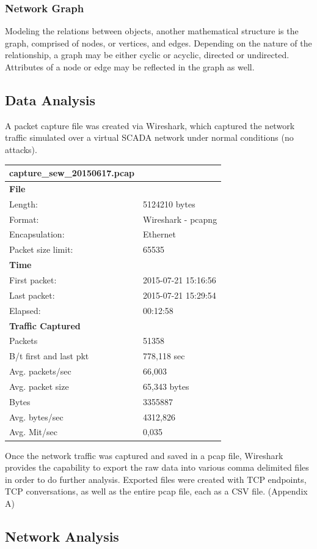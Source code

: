 \documentclass[11pt,]{article}
\begin{document}
\subsubsection{Network Graph}\label{network-graph}

Modeling the relations between objects, another mathematical structure
is the graph, comprised of nodes, or vertices, and edges. Depending on
the nature of the relationship, a graph may be either cyclic or acyclic,
directed or undirected. Attributes of a node or edge may be reflected in
the graph as well.

\subsection{Data Analysis}\label{data-analysis}

A packet capture file was created via Wireshark, which captured the
network traffic simulated over a virtual SCADA network under normal
conditions (no attacks).

\begin{longtable}[c]{@{}ll@{}}
\toprule
\textbf{capture\_sew\_20150617.pcap} &\tabularnewline
\midrule
\endhead
\textbf{File} &\tabularnewline
Length: & 5124210 bytes\tabularnewline
Format: & Wireshark - pcapng\tabularnewline
Encapsulation: & Ethernet\tabularnewline
Packet size limit: & 65535\tabularnewline
\textbf{Time} &\tabularnewline
First packet: & 2015-07-21 15:16:56\tabularnewline
Last packet: & 2015-07-21 15:29:54\tabularnewline
Elapsed: & 00:12:58\tabularnewline
\textbf{Traffic Captured} &\tabularnewline
Packets & 51358\tabularnewline
B/t first and last pkt & 778,118 sec\tabularnewline
Avg. packets/sec & 66,003\tabularnewline
Avg. packet size & 65,343 bytes\tabularnewline
Bytes & 3355887\tabularnewline
Avg. bytes/sec & 4312,826\tabularnewline
Avg. Mit/sec & 0,035\tabularnewline
\bottomrule
\end{longtable}

Once the network traffic was captured and saved in a pcap file,
Wireshark provides the capability to export the raw data into various
comma delimited files in order to do further analysis. Exported files
were created with TCP endpoints, TCP conversations, as well as the
entire pcap file, each as a CSV file. (Appendix A)

\newpage

\subsection{Network Analysis}\label{network-analysis}
\end{document}
